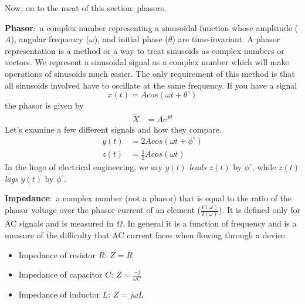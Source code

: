 \documentclass[nobib]{tufte-handout}
\newcommand{\defn}[2]{\noindent\textbf{#1}:\ #2}
\begin{document}
Now, on to the meat of this section: phasors.

\defn{Phasor}{a complex number representing a sinusoidal 
function whose amplitude ($A$), angular frequency ($\omega$), 
and initial phase ($\theta$) are time-invariant.}
A phasor representation is a 
method or a way to treat sinusoids as complex
numbers or vectors. We represent a sinusoidal signal as a complex number
which will make operations of sinusoids much easier. The only requirement of
this method is that all sinusoids involved have to oscillate at the same
frequency. 
If you have a signal 
\[x(t) = Acos(\omega t + \theta^\circ)\]
the phasor is given by 
\begin{align*}
    \tilde{X} &= Ae^{j \theta}
\end{align*}
Let's examine a few different signals and how they compare. 
\begin{align*}
    y(t) &= 2Acos(\omega t + \phi^\circ) \\
    z(t) &= \frac{1}{2}Acos(\omega t)
\end{align*}
In the lingo of electrical engineering, we say $y(t)$ 
\emph{leads} $z(t)$ by $\phi^\circ$, while 
$z(t)$ \emph{lags} $y(t)$ by $\phi^\circ$. 

\defn{Impedance}{a complex number (not a phasor) that is equal to the
ratio of the phasor voltage over the phasor current of an element ($\frac{V(\omega)}{I(\omega)}$). It is
defined only for AC signals and is measured in $\Omega$. In general it is a function
of frequency and is a measure of the difficulty that AC current faces when
flowing through a device.}

\begin{itemize}
    \item Impedance of resistor $R$: $Z = R$
    \item Impedance of capacitor $C$: $Z = \frac{-j}{\omega C}$
    \item Impedance of inductor $L$: $Z = j \omega L$
\end{itemize}
\end{document}
